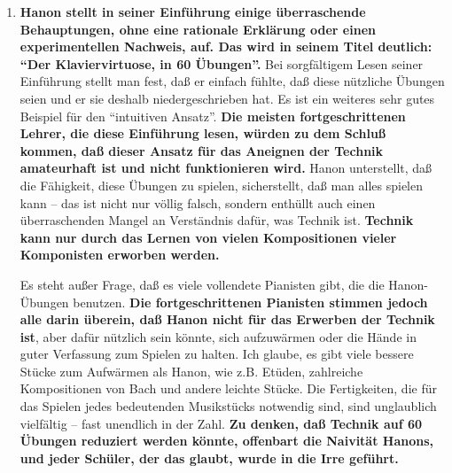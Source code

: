 \begin{enumerate}[label={\roman*.}]  

\item \label{c1iii7h1}\textbf{Hanon stellt in seiner Einführung einige überraschende Behauptungen, ohne eine rationale Erklärung oder einen experimentellen Nachweis, auf.
Das wird in seinem Titel deutlich: \enquote{Der Klaviervirtuose, in 60 Übungen}.}
Bei sorgfältigem Lesen seiner Einführung stellt man fest, daß er einfach fühlte, daß diese nützliche Übungen seien und er sie deshalb niedergeschrieben hat.
Es ist ein weiteres sehr gutes Beispiel für den \enquote{intuitiven Ansatz}.
\textbf{Die meisten fortgeschrittenen Lehrer, die diese Einführung lesen, würden zu dem Schluß kommen, daß dieser Ansatz für das Aneignen der Technik amateurhaft ist und nicht funktionieren wird.}
Hanon unterstellt, daß die Fähigkeit, diese Übungen zu spielen, sicherstellt, daß man alles spielen kann -- das ist nicht nur völlig falsch, sondern enthüllt auch einen überraschenden Mangel an Verständnis dafür, was Technik ist.
\textbf{Technik kann nur durch das Lernen von vielen Kompositionen vieler Komponisten erworben werden.}

Es steht außer Frage, daß es viele vollendete Pianisten gibt, die die Hanon-Übungen benutzen.
\textbf{Die fortgeschrittenen Pianisten stimmen jedoch alle darin überein, daß Hanon nicht für das Erwerben der Technik ist}, aber dafür nützlich sein könnte, sich aufzuwärmen oder die Hände in guter Verfassung zum Spielen zu halten.
Ich glaube, es gibt viele bessere Stücke zum Aufwärmen als Hanon, wie z.B. Etüden, zahlreiche Kompositionen von Bach und andere leichte Stücke.
Die Fertigkeiten, die für das Spielen jedes bedeutenden Musikstücks notwendig sind, sind unglaublich vielfältig -- fast unendlich in der Zahl.
\textbf{Zu denken, daß Technik auf 60 Übungen reduziert werden könnte, offenbart die Naivität Hanons, und jeder Schüler, der das glaubt, wurde in die Irre geführt.}



\end{enumerate}
